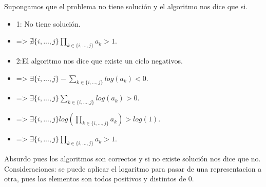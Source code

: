 Supongamos que el problema no tiene soluci\'on y el algoritmo nos dice que si.\\
\begin{itemize}
	\item 1: No tiene soluci\'on.\\
	\item => $\nexists \{i,...,j\}  \prod_{k \in \{i,...,j\}} a_{k} > 1$.\\
\end{itemize}	
\begin{itemize}
	\item 2:El algoritmo nos dice que existe un ciclo negativos.\\
	\item => $\exists \{i,...,j\}  -\sum_{k \in \{i,...,j\}} log(a_{k}) < 0$.\\
	\item => $\exists \{i,...,j\}  \sum_{k \in \{i,...,j\}} log(a_{k}) > 0$.\\
	\item => $\exists \{i,...,j\}  log(\prod_{k \in \{i,...,j\}} a_{k}) > log(1)$.\\
	\item => $\exists \{i,...,j\}  \prod_{k \in \{i,...,j\}} a_{k} > 1$.\\
\end{itemize}

Absurdo pues los algoritmos son correctos y si no existe solución nos dice que no.\\



Consideraciones: se puede aplicar el logaritmo para pasar de una representacion a otra, pues los elementos son todos positivos y distintos de 0.\\